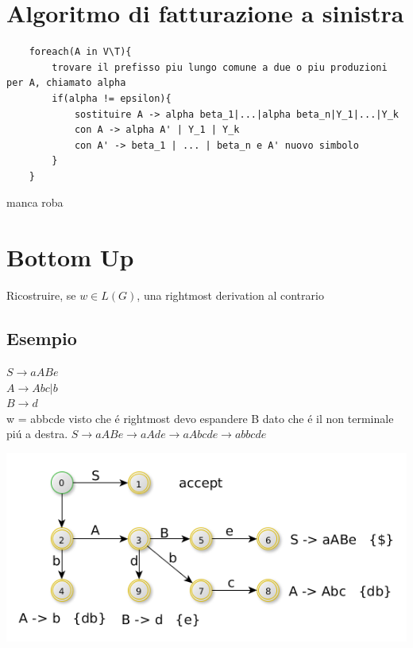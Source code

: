 \section{Algoritmo di fatturazione a sinistra}
\begin{lstlisting}
    foreach(A in V\T){
        trovare il prefisso piu lungo comune a due o piu produzioni per A, chiamato alpha 
        if(alpha != epsilon){
            sostituire A -> alpha beta_1|...|alpha beta_n|Y_1|...|Y_k
            con A -> alpha A' | Y_1 | Y_k 
            con A' -> beta_1 | ... | beta_n e A' nuovo simbolo
        }
    }
\end{lstlisting}

manca roba

\section{Bottom Up}
Ricostruire, se $w \in L(G)$, una rightmost derivation al contrario

\subsection{Esempio}
$S \rightarrow aABe$\\
$A \rightarrow Abc|b$\\
$B \rightarrow d$\\

w = abbcde visto che \'e rightmost devo espandere B dato che \'e il non terminale pi\'u a destra.
$S \rightarrow aABe \rightarrow aAde \rightarrow aAbcde \rightarrow abbcde $\\

\begin{center}
    \includegraphics[scale=0.4]{Chapters/Img/c02_14.png}\\
\end{center} 

